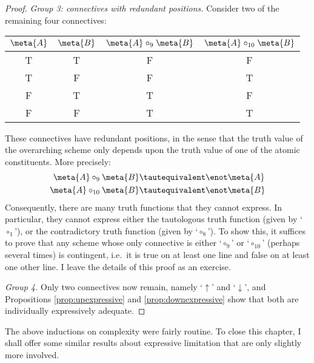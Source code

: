 \begin{thm}
\begin{proof}
		\emph{Group 3: connectives with redundant positions.} 
		Consider two of the remaining four connectives:
		
	\begin{center}
		\begin{tabular}{c c | c c}
		$\meta{A}$ & $\meta{B}$ & $\meta{A} \mathrel{\circ_9} \meta{B}$ & $\meta{A} \mathrel{\circ_{10}} \meta{B}$\\
		\hline
			 T & T & F & F \\
			 T & F & F & T\\
			 F & T & T & F \\
			 F & F & T & T
	\end{tabular}
	\end{center}
	These connectives have redundant positions, in the sense that the truth value of the overarching scheme only depends upon the truth value of one of the atomic constituents. More precisely:
		\begin{align*}
		 	\meta{A} \circ_9 \meta{B} &\tautequivalent \enot \meta{A}\\
			\meta{A} \circ_{10} \meta{B} &\tautequivalent \enot \meta{B}
		\end{align*}
		Consequently, there are many truth functions that they cannot express. In particular, they cannot express either the tautologous truth function (given by `$\circ_1$'), or the contradictory truth function (given by `$\circ_8$'). To show this, it suffices to prove that any scheme whose only connective is either `$\circ_9$' or `$\circ_{10}$' (perhaps several times) is contingent, i.e.\ it is true on at least one line and false on at least one other line. I leave the details of this proof as an exercise.
		
		\emph{Group 4.} Only two connectives now remain, namely `$\uparrow$' and `$\downarrow$', and 	Propositions \ref{prop:upexpressive} and \ref{prop:downexpressive} show that both are individually expressively adequate.
		\end{proof}
	\end{thm}\noindent
The above inductions on complexity were fairly routine. To close this chapter, I shall offer some similar results about expressive limitation that are only slightly more involved.
